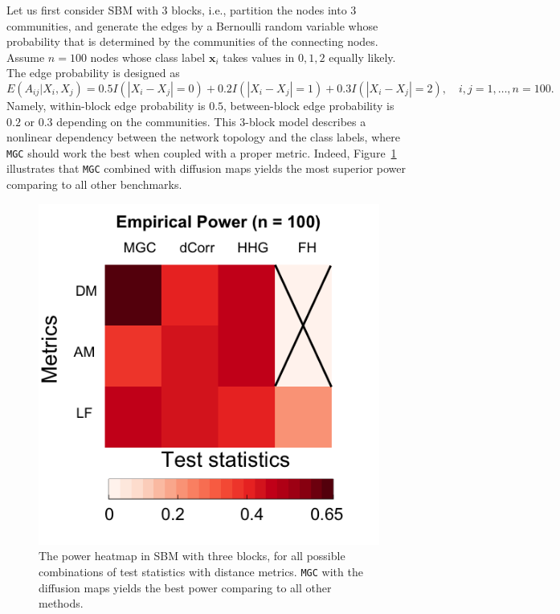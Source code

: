 \documentclass[11pt]{article}
\theoremstyle{definition}
\begin{document}
Let us first consider SBM with $3$ blocks, i.e., partition the nodes into $3$ communities, and generate the edges by a Bernoulli random variable whose probability that is determined by the communities of the connecting nodes. Assume $n=100$ nodes whose class label $\mathbf{x}_i$ takes values in $0,1,2$ equally likely. The edge probability is designed as
\begin{equation}
\label{eq:Three}
E(A_{ij} | X_{i}, X_{j}) = 0.5 I(|X_{i} - X_{j}| = 0) + 0.2 I(|X_{i} - X_{j}| = 1) + 0.3 I(|X_{i} - X_{j}| = 2), \quad i,j = 1, \ldots, n = 100.
\end{equation} 
Namely, within-block edge probability is $0.5$, between-block edge probability is $0.2$ or $0.3$ depending on the communities. This 3-block model describes a nonlinear dependency between the network topology and the class labels, where \texttt{MGC} should work the best when coupled with a proper metric. Indeed, Figure~\ref{fig:threeSBM} illustrates that \texttt{MGC} combined with diffusion maps yields the most superior power comparing to all other benchmarks.

\begin{figure}
	\centering
	\includegraphics[width=0.4\paperwidth, height=0.4\paperwidth]{ThreeSBM_results_short.png}
	\caption{The power heatmap in SBM with three blocks, for all possible combinations of test statistics with distance metrics. \texttt{MGC} with the diffusion maps yields the best power comparing to all other methods. }
	\label{fig:threeSBM}
\end{figure}
\end{document}
